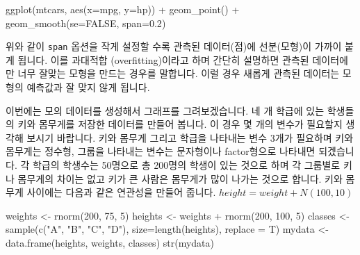 \documentclass[
]{book}
\newenvironment{Shaded}{\begin{snugshade}}{\end{snugshade}}
\newcommand{\AttributeTok}[1]{\textcolor[rgb]{0.77,0.63,0.00}{#1}}
\newcommand{\ConstantTok}[1]{\textcolor[rgb]{0.00,0.00,0.00}{#1}}
\newcommand{\DecValTok}[1]{\textcolor[rgb]{0.00,0.00,0.81}{#1}}
\newcommand{\FloatTok}[1]{\textcolor[rgb]{0.00,0.00,0.81}{#1}}
\newcommand{\FunctionTok}[1]{\textcolor[rgb]{0.00,0.00,0.00}{#1}}
\newcommand{\NormalTok}[1]{#1}
\newcommand{\OtherTok}[1]{\textcolor[rgb]{0.56,0.35,0.01}{#1}}
\newcommand{\SpecialCharTok}[1]{\textcolor[rgb]{0.00,0.00,0.00}{#1}}
\newcommand{\StringTok}[1]{\textcolor[rgb]{0.31,0.60,0.02}{#1}}
\begin{document}
\begin{Shaded}
\begin{Highlighting}[]
\FunctionTok{ggplot}\NormalTok{(mtcars, }\FunctionTok{aes}\NormalTok{(}\AttributeTok{x=}\NormalTok{mpg, }\AttributeTok{y=}\NormalTok{hp)) }\SpecialCharTok{+}
  \FunctionTok{geom\_point}\NormalTok{() }\SpecialCharTok{+}
  \FunctionTok{geom\_smooth}\NormalTok{(}\AttributeTok{se=}\ConstantTok{FALSE}\NormalTok{, }\AttributeTok{span=}\FloatTok{0.2}\NormalTok{)}
\end{Highlighting}
\end{Shaded}

위와 같이 \texttt{span} 옵션을 작게 설정할 수록 관측된 데이터(점)에 선분(모형)이 가까이 붙게 됩니다. 이를 과대적합 (overfitting)이라고 하며 간단히 설명하면 관측된 데이터에만 너무 잘맞는 모형을 만드는 경우를 말합니다. 이럴 경우 새롭게 관측된 데이터는 모형의 예측값과 잘 맞지 않게 됩니다.

이번에는 모의 데이터를 생성해서 그래프를 그려보겠습니다. 네 개 학급에 있는 학생들의 키와 몸무게를 저장한 데이터를 만들어 봅니다. 이 경우 몇 개의 변수가 필요할지 생각해 보시기 바랍니다. 키와 몸무게 그리고 학급을 나타내는 변수 3개가 필요하며 키와 몸무게는 정수형, 그룹을 나타내는 변수는 문자형이나 factor형으로 나타내면 되겠습니다. 각 학급의 학생수는 50명으로 총 200명의 학생이 있는 것으로 하며 각 그룹별로 키나 몸무게의 차이는 없고 키가 큰 사람은 몸무게가 많이 나가는 것으로 합니다. 키와 몸무게 사이에는 다음과 같은 연관성을 만들어 줍니다. \(height= weight + N(100, 10)\)

\begin{Shaded}
\begin{Highlighting}[]
\NormalTok{weights }\OtherTok{\textless{}{-}} \FunctionTok{rnorm}\NormalTok{(}\DecValTok{200}\NormalTok{, }\DecValTok{75}\NormalTok{, }\DecValTok{5}\NormalTok{)}
\NormalTok{heights }\OtherTok{\textless{}{-}}\NormalTok{ weights }\SpecialCharTok{+} \FunctionTok{rnorm}\NormalTok{(}\DecValTok{200}\NormalTok{, }\DecValTok{100}\NormalTok{, }\DecValTok{5}\NormalTok{)}
\NormalTok{classes }\OtherTok{\textless{}{-}} \FunctionTok{sample}\NormalTok{(}\FunctionTok{c}\NormalTok{(}\StringTok{"A"}\NormalTok{, }\StringTok{"B"}\NormalTok{, }\StringTok{"C"}\NormalTok{, }\StringTok{"D"}\NormalTok{), }\AttributeTok{size=}\FunctionTok{length}\NormalTok{(heights), }\AttributeTok{replace =}\NormalTok{ T)}
\NormalTok{mydata }\OtherTok{\textless{}{-}} \FunctionTok{data.frame}\NormalTok{(heights, weights, classes)}
\FunctionTok{str}\NormalTok{(mydata)}
\end{Highlighting}
\end{Shaded}
\end{document}
